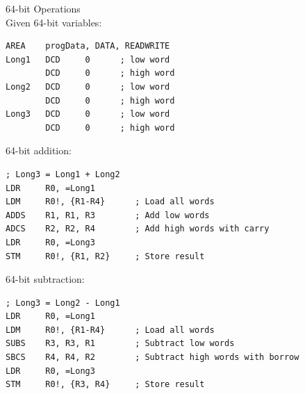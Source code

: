 \begin{example2}{64-bit Operations}\\
Given 64-bit variables:
\begin{lstlisting}[language=armasm, style=basesmol]
    AREA    progData, DATA, READWRITE
Long1   DCD     0      ; low word
        DCD     0      ; high word
Long2   DCD     0      ; low word
        DCD     0      ; high word
Long3   DCD     0      ; low word
        DCD     0      ; high word
\end{lstlisting}

64-bit addition:
\begin{lstlisting}[language=armasm, style=basesmol]
; Long3 = Long1 + Long2
LDR     R0, =Long1
LDM     R0!, {R1-R4}      ; Load all words
ADDS    R1, R1, R3        ; Add low words
ADCS    R2, R2, R4        ; Add high words with carry
LDR     R0, =Long3
STM     R0!, {R1, R2}     ; Store result
\end{lstlisting}

64-bit subtraction:
\begin{lstlisting}[language=armasm, style=basesmol]
; Long3 = Long2 - Long1
LDR     R0, =Long1
LDM     R0!, {R1-R4}      ; Load all words
SUBS    R3, R3, R1        ; Subtract low words
SBCS    R4, R4, R2        ; Subtract high words with borrow
LDR     R0, =Long3
STM     R0!, {R3, R4}     ; Store result
\end{lstlisting}
\end{example2}









